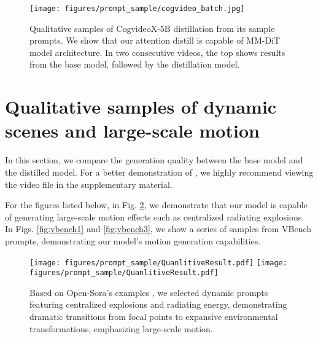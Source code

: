 \begin{figure}[t]
  \centering
  \texttt{[image: figures/prompt\_sample/cogvideo\_batch.jpg]}
  \caption{Qualitative samples of CogvideoX-5B \cite{yang2024cogvideox} distillation from its sample prompts. We show that our attention distill is capable of MM-DiT model architecture. In two consecutive videos, the top shows results from the base model, followed by the distillation model.}
  \label{fig:cog}
\end{figure}




\section{Qualitative samples of dynamic scenes and large-scale motion }
\label{appendix:sample}

In this section, we compare the generation quality between the base model and the distilled model. For a better demonstration of \methodname, we highly recommend viewing the video file in the supplementary material.

For the figures listed below, in Fig. \ref{fig:vis2}, we demonstrate that our model is capable of generating large-scale motion effects such as centralized radiating explosions.
In Figs. \ref{fig:vbench1} and \ref{fig:vbench3}, we show a series of samples from VBench prompts, demonstrating our model's motion generation capabilities. %


\begin{figure}[t]
  \centering
  \texttt{[image: figures/prompt\_sample/QuanlitiveResult.pdf]}
  \texttt{[image: figures/prompt\_sample/QuanlitiveResult.pdf]}
  \caption{Based on Open-Sora's examples \cite{opensora}  , we selected dynamic prompts featuring centralized explosions and radiating energy, demonstrating dramatic transitions from focal points to expansive environmental transformations, emphasizing large-scale motion.}
  \label{fig:vis2}
\end{figure}

